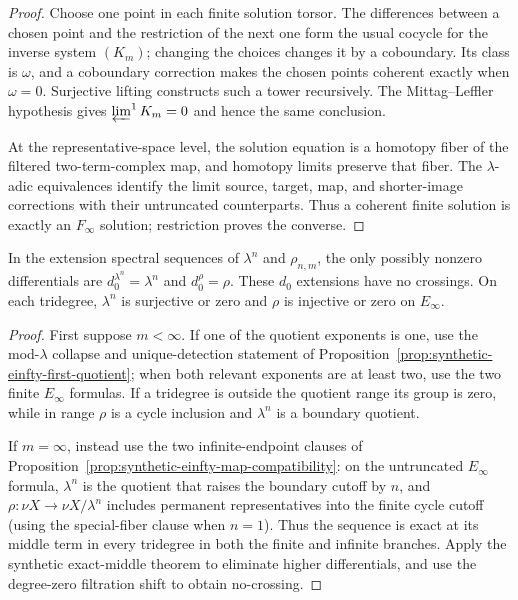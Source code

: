 \begin{proof}
  Choose one point in each finite solution torsor.  The differences between a
  chosen point and the restriction of the next one form the usual cocycle for
  the inverse system $(K_m)$; changing the choices changes it by a coboundary.
  Its class is $\omega$, and a coboundary correction makes the chosen points
  coherent exactly when $\omega=0$.  Surjective lifting constructs such a
  tower recursively.  The Mittag--Leffler hypothesis gives
  $\varprojlim^1K_m=0$ and hence the same conclusion.

  At the representative-space level, the solution equation is a homotopy fiber
  of the filtered two-term-complex map, and homotopy limits preserve that
  fiber.  The $\lambda$-adic equivalences identify the limit source, target,
  map, and shorter-image corrections with their untruncated counterparts.
  Thus a coherent finite solution is exactly an $F_\infty$ solution; restriction
  proves the converse.
\end{proof}

\begin{proposition}
  \label{prop:lambda-rho-ess-only-d0}
  \notready
  In the extension spectral sequences of $\lambda^n$ and $\rho_{n,m}$, the
  only possibly nonzero differentials are
  $d_0^{\lambda^n}=\lambda^n$ and $d_0^\rho=\rho$.  These $d_0$ extensions have
  no crossings.  On each tridegree, $\lambda^n$ is surjective or zero and
  $\rho$ is injective or zero on $E_\infty$.
\end{proposition}

\begin{proof}
  First suppose $m<\infty$.  If one of the quotient exponents is one, use the
  mod-$\lambda$ collapse and unique-detection statement of
  Proposition~\ref{prop:synthetic-einfty-first-quotient}; when both relevant
  exponents are at least two, use the two finite $E_\infty$ formulas.  If a
  tridegree is outside the quotient range its group is zero, while in range
  $\rho$ is a cycle inclusion and $\lambda^n$ is a boundary quotient.

  If $m=\infty$, instead use the two infinite-endpoint clauses of
  Proposition~\ref{prop:synthetic-einfty-map-compatibility}: on the
  untruncated $E_\infty$ formula, $\lambda^n$ is the quotient that raises the
  boundary cutoff by $n$, and
  $\rho:\nu X\to\nu X/\lambda^n$ includes permanent representatives into the
  finite cycle cutoff (using the special-fiber clause when $n=1$).  Thus the
  sequence is exact at its middle term in every tridegree in both the finite
  and infinite branches.
  Apply the synthetic exact-middle theorem to eliminate higher differentials,
  and use the degree-zero filtration shift to obtain no-crossing.
\end{proof}

